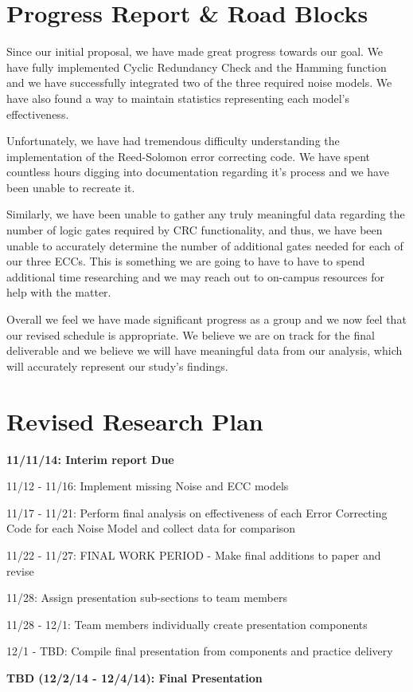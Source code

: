 \documentclass{sigcomm-alternate}
\begin{document}
\section{Progress Report \& Road Blocks}
Since our initial proposal, we have made great progress towards our goal. We have fully implemented Cyclic Redundancy Check and the Hamming function and we have successfully integrated two of the three required noise models. We have also found a way to maintain statistics representing each model's effectiveness.

Unfortunately, we have had tremendous difficulty understanding the implementation of the Reed-Solomon error correcting code. We have spent countless hours digging into documentation regarding it's process and we have been unable to recreate it.

Similarly, we have been unable to gather any truly meaningful data regarding the number of logic gates required by CRC functionality, and thus, we have been unable to accurately determine the number of additional gates needed for each of our three ECCs. This is something we are going to have to have to spend additional time researching and we may reach out to on-campus resources for help with the matter.

Overall we feel we have made significant progress as a group and we now feel that our revised schedule is appropriate. We believe we are on track for the final deliverable and we believe we will have meaningful data from our analysis, which will accurately represent our study's findings.

\section{Revised Research Plan}

\textbf{11/11/14: Interim report Due}

11/12 - 11/16: Implement missing Noise and ECC models

11/17 - 11/21: Perform final analysis on effectiveness of each Error Correcting Code for each Noise Model and collect data for comparison

11/22 - 11/27: FINAL WORK PERIOD - Make final additions to paper and revise

11/28: Assign presentation sub-sections to team members

11/28 - 12/1: Team members individually create presentation components

12/1 - TBD: Compile final presentation from components and practice delivery

\textbf{TBD (12/2/14 - 12/4/14): Final Presentation}

\nocite{*}

 

\balancecolumns
\end{document}
